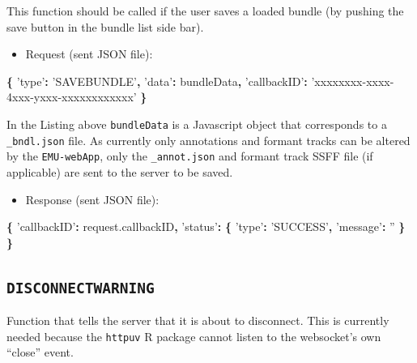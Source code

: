 \documentclass[]{book}
\newenvironment{Shaded}{\begin{snugshade}}{\end{snugshade}}
\newcommand{\AttributeTok}[1]{\textcolor[rgb]{0.77,0.63,0.00}{#1}}
\newcommand{\NormalTok}[1]{#1}
\newcommand{\OperatorTok}[1]{\textcolor[rgb]{0.81,0.36,0.00}{\textbf{#1}}}
\newcommand{\StringTok}[1]{\textcolor[rgb]{0.31,0.60,0.02}{#1}}
\newcommand{\VariableTok}[1]{\textcolor[rgb]{0.00,0.00,0.00}{#1}}
\providecommand{\tightlist}{%
  \setlength{\itemsep}{0pt}\setlength{\parskip}{0pt}}
\begin{document}
This function should be called if the user saves a loaded bundle (by pushing the save button in the bundle list side bar).

\begin{itemize}
\tightlist
\item
  Request (sent JSON file):
\end{itemize}

\begin{Shaded}
\begin{Highlighting}[]
\OperatorTok{\{}
  \StringTok{'type'}\OperatorTok{:} \StringTok{'SAVEBUNDLE'}\OperatorTok{,}
  \StringTok{'data'}\OperatorTok{:}\NormalTok{ bundleData}\OperatorTok{,}
  \StringTok{'callbackID'}\OperatorTok{:} \StringTok{'xxxxxxxx-xxxx-4xxx-yxxx-xxxxxxxxxxxx'}
\OperatorTok{\}}
\end{Highlighting}
\end{Shaded}

In the Listing above \texttt{bundleData} is a Javascript object that corresponds to a \texttt{\_bndl.json} file. As currently only annotations and formant tracks can be altered by the \texttt{EMU-webApp}, only the \texttt{\_annot.json} and formant track SSFF file (if applicable) are sent to the server to be saved.

\begin{itemize}
\tightlist
\item
  Response (sent JSON file):
\end{itemize}

\begin{Shaded}
\begin{Highlighting}[]
\OperatorTok{\{}
  \StringTok{'callbackID'}\OperatorTok{:} \VariableTok{request}\NormalTok{.}\AttributeTok{callbackID}\OperatorTok{,}
  \StringTok{'status'}\OperatorTok{:} \OperatorTok{\{}
    \StringTok{'type'}\OperatorTok{:} \StringTok{'SUCCESS'}\OperatorTok{,}
    \StringTok{'message'}\OperatorTok{:} \StringTok{''}
  \OperatorTok{\}}
\OperatorTok{\}}
\end{Highlighting}
\end{Shaded}

\hypertarget{disconnectwarning}{%
\subsection{\texorpdfstring{\texttt{DISCONNECTWARNING}}{DISCONNECTWARNING}}\label{disconnectwarning}}

Function that tells the server that it is about to disconnect. This is currently needed because the \texttt{httpuv} R package cannot listen to the websocket's own ``close'' event.
\end{document}
